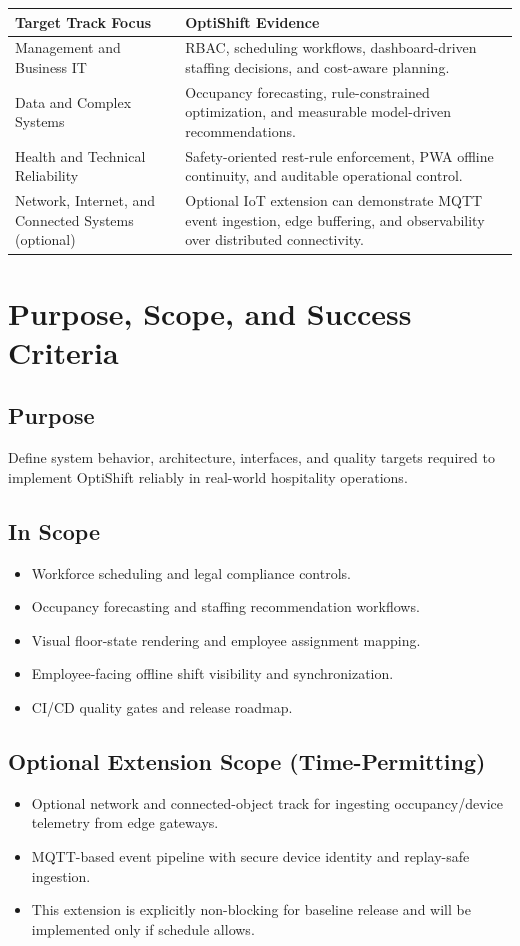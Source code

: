 \documentclass[11pt,a4paper]{article}
\newcommand{\thead}[1]{\textcolor{HeaderText}{\textbf{#1}}}
\begin{document}
\begin{tabularx}{\textwidth}{P{0.36\textwidth}Y}
\toprule
{}
\thead{Target Track Focus} & \thead{OptiShift Evidence} \\
\midrule
Management and Business IT & RBAC, scheduling workflows, dashboard-driven staffing decisions, and cost-aware planning. \\
Data and Complex Systems & Occupancy forecasting, rule-constrained optimization, and measurable model-driven recommendations. \\
Health and Technical Reliability & Safety-oriented rest-rule enforcement, PWA offline continuity, and auditable operational control. \\
Network, Internet, and Connected Systems (optional) & Optional IoT extension can demonstrate MQTT event ingestion, edge buffering, and observability over distributed connectivity. \\
\bottomrule
\end{tabularx}

\section{Purpose, Scope, and Success Criteria}
\subsection{Purpose}
Define system behavior, architecture, interfaces, and quality targets required to implement OptiShift reliably in real-world hospitality operations.

\subsection{In Scope}
\begin{itemize}
  \item Workforce scheduling and legal compliance controls.
  \item Occupancy forecasting and staffing recommendation workflows.
  \item Visual floor-state rendering and employee assignment mapping.
  \item Employee-facing offline shift visibility and synchronization.
  \item CI/CD quality gates and release roadmap.
\end{itemize}

\subsection{Optional Extension Scope (Time-Permitting)}
\begin{itemize}
  \item Optional network and connected-object track for ingesting occupancy/device telemetry from edge gateways.
  \item MQTT-based event pipeline with secure device identity and replay-safe ingestion.
  \item This extension is explicitly non-blocking for baseline release and will be implemented only if schedule allows.
\end{itemize}
\end{document}
